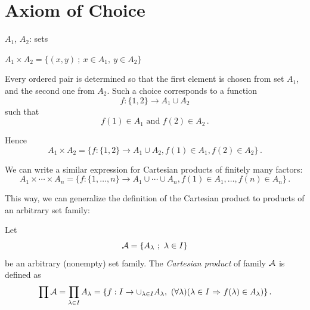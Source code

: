 \documentclass[11pt,paper=b5,footinclude,headinclude]{scrbook} %
\def\sledi {{~\Rightarrow~}}
\def\zgled{\paragraph{Example:}}
\theoremstyle{remark}
\theoremstyle{definition} %
\theoremstyle{theorem} %
\begin{document}
\section{Axiom of Choice}
%
%
%
%
%

$A_1$, $A_2$: sets

$A_1\times A_2 = \{(x,y)~;~x\in A_1,~y\in A_2\}$

Every ordered pair is determined so that the first element is chosen from set $A_1$, and the second one from $A_2$.
Such a choice corresponds to a function
$$f:\{1,2\} \to A_1\cup A_2$$
such that
$$f(1)\in A_1 \textrm{ and }f(2)\in A_2\,.$$

Hence
$$A_1\times A_2 = \{f:\{1,2\} \to A_1\cup A_2,
f(1)\in A_1, f(2)\in A_2\}\,.$$

We can write a similar expression for Cartesian products of finitely many factors:
$$A_1\times \cdots \times A_n= \{f:\{1,\ldots, n\} \to A_1\cup \cdots\cup A_n,
f(1)\in A_1, \ldots, f(n)\in A_n\}\,.$$

\bigskip
This way, we can generalize the definition of the Cartesian product to
products of an arbitrary set family:

Let
$${\cal A}=\{A_{\lambda}~;~\lambda\in I\}$$
be an arbitrary (nonempty) set family.
The {\em Cartesian product} of family ${\cal A}$ is defined as
$$\prod{\cal A} = \prod_{\lambda\in I}A_\lambda = \{f:I\to\cup_{\lambda\in I}A_\lambda,~(\forall\lambda)(\lambda\in I\sledi f(\lambda)\in A_\lambda)\}\,.$$
\end{document}
